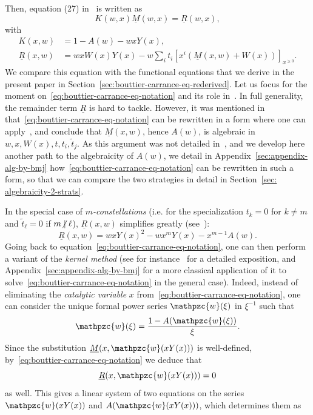 \documentclass{scrartcl}
\newcommand\wt[1]{\widetilde{#1}}
\newcommand{\notdiv}{\hspace{-0.25em}\not\hspace{0.25em}\mid}
\newcommand\ul[1]{\underline{#1}}
\begin{document}
Then, equation (27) in~\cite{bouttier-carrance} is written as
\begin{equation}
K(w,x)\ul M(w,x) = \ul R(w,x),
\label{eq:bouttier-carrance-eq-notation}
\end{equation}
with 
\begin{align*}
K(x,w) &= 1 - A(w) - w x Y(x),\\
\ul R(x,w)&= w x W(x)Y(x) - w\sum_i t_i \left[x^i(\ul M(x,w)+W(x))\right]_{x^{\geq 0}}.
\end{align*}
We compare this equation with the functional equations that we derive in the present paper in Section~\ref{sec:bouttier-carrance-eq-rederived}. Let us focus for the moment on~\eqref{eq:bouttier-carrance-eq-notation} and its role in~\cite{bouttier-carrance}. In full generality, the remainder term $\ul R$ is hard to tackle. However, it was mentioned in~\cite[Section 3]{bouttier-carrance} that~\eqref{eq:bouttier-carrance-eq-notation} can be rewritten in a form where one can apply~\cite[Theorem 3]{BoJe06}, and conclude that $\ul M(x,w)$, hence $A(w)$, is algebraic in $w, x, W(x), t, t_i, \wt{t}_j$. As this argument was not detailed in~\cite{bouttier-carrance}, and we develop here another path to the algebraicity of $A(w)$, we detail in Appendix~\ref{sec:appendix-alg-by-bmj} how~\eqref{eq:bouttier-carrance-eq-notation} can be rewritten in such a form, so that we can compare the two strategies in detail in Section~\ref{sec: algebraicity-2-strats}.


In the special case of \emph{$m$-constellations} (i.e. for the specialization $t_k=0$ for $k \neq m$ and $\wt{t}_\ell=0$ if $m \notdiv \ell$), $\ul R(x,w)$ simplifies greatly (see~\cite[Section 4]{bouttier-carrance}):
\[
\ul R(x,w)=wxY(x)^2-wx^mY(x)-x^{m-1}A(w).
\]
Going back to equation~\eqref{eq:bouttier-carrance-eq-notation}, one can then perform a variant of the \emph{kernel method} (see for instance~\cite{BoJe06} for a detailed exposition, and Appendix~\ref{sec:appendix-alg-by-bmj} for a more classical application of it to solve~\eqref{eq:bouttier-carrance-eq-notation} in the general case). Indeed, instead of eliminating the \emph{catalytic variable} $x$ from~\eqref{eq:bouttier-carrance-eq-notation}, one can consider the unique formal power series $\mathpzc{w}(\xi)$ in $\xi^{-1}$ such that
\begin{equation}
\mathpzc{w}(\xi)=\frac{1-A(\mathpzc{w}(\xi))}{\xi}.
\label{eq:kernel-relation}
\end{equation}
Since the substitution $\ul M(x,\mathpzc{w}(xY(x)))$ is well-defined, by~\eqref{eq:bouttier-carrance-eq-notation} we deduce that
\[
\ul R(x,\mathpzc{w}(xY(x)))=0
\]
as well. This gives a linear system of two equations on the series $\mathpzc{w}(xY(x))$ and $A(\mathpzc{w}(xY(x)))$, which determines them as
\end{document}
